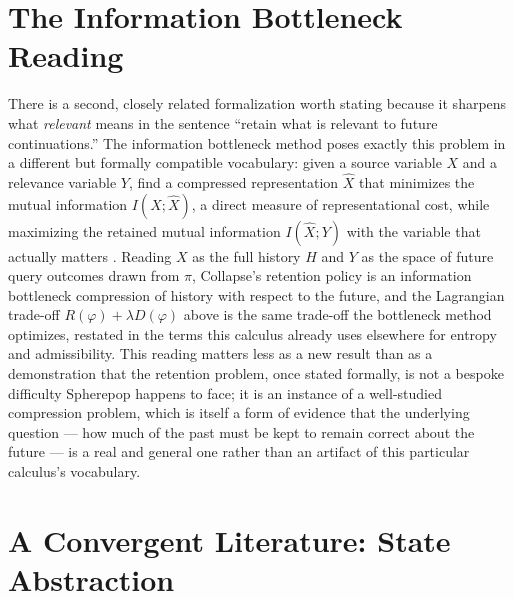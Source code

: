\documentclass[11pt]{article}
\begin{document}
\section{The Information Bottleneck Reading}

There is a second, closely related formalization worth stating because it sharpens what \emph{relevant} means in the sentence ``retain what is relevant to future continuations.'' The information bottleneck method poses exactly this problem in a different but formally compatible vocabulary: given a source variable $X$ and a relevance variable $Y$, find a compressed representation $\hat{X}$ that minimizes the mutual information $I(X; \hat{X})$, a direct measure of representational cost, while maximizing the retained mutual information $I(\hat{X}; Y)$ with the variable that actually matters \cite{tishby1999}. Reading $X$ as the full history $H$ and $Y$ as the space of future query outcomes drawn from $\pi$, Collapse's retention policy is an information bottleneck compression of history with respect to the future, and the Lagrangian trade-off $R(\varphi) + \lambda D(\varphi)$ above is the same trade-off the bottleneck method optimizes, restated in the terms this calculus already uses elsewhere for entropy and admissibility. This reading matters less as a new result than as a demonstration that the retention problem, once stated formally, is not a bespoke difficulty Spherepop happens to face; it is an instance of a well-studied compression problem, which is itself a form of evidence that the underlying question --- how much of the past must be kept to remain correct about the future --- is a real and general one rather than an artifact of this particular calculus's vocabulary.

\section{A Convergent Literature: State Abstraction}
\end{document}
